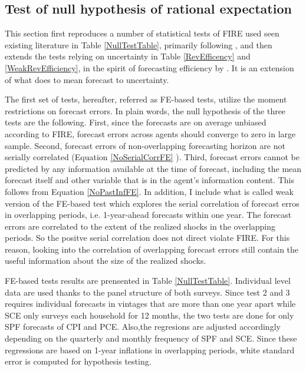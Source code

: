 \documentclass[]{article}
\begin{document}
\subsection{Test of null hypothesis of rational expectation}\label{NullTest}

This section first reproduces a number of statistical tests of FIRE used seen existing literature in Table \ref{NullTestTable}, primarily following \citet{mankiw2003disagreement},  and then extends the tests relying on uncertainty in Table \ref{RevEfficency} and \ref{WeakRevEfficiency}, in the spirit of forecasting efficiency by \citet{nordhaus1987forecasting}. It is an extension of what \citet{fuhrer2018intrinsic} does to mean forecast to uncertainty.  
 
The first set of tests, hereafter, referred as FE-based tests, utilize the moment restrictions on forecast errors. In plain words, the null hypothesis of the three tests are the following. First, since the forecasts are on average unbiased according to FIRE, forecast errors across agents should converge to zero in large sample. Second, forecast errors of non-overlapping forecasting horizon are not serially correlated (Equation \ref{NoSerialCorrFE} ).  Third, forecast errors cannot be predicted by any information available at the time of forecast, including the mean forecast itself and other variable that is in the agent's information content. This follows from Equation \ref{NoPastInfFE}. In addition, I include what is called weak version of the FE-based test which explores the serial correlation of forecast erros in overlapping periods,  i.e. 1-year-ahead forecasts within one year. The forecast errors are correlated to the extent of the realized shocks in the overlapping periods. So the positve serial correlation does not direct violate FIRE. For this reason, looking into the correlation of overlapping forecast errors still contain the useful information about the size of the realized shocks. 

FE-based tests results are prensented in Table \ref{NullTestTable}. Individual level data are used thanks to the panel structure of both surveys. Since test 2 and 3 requires individual forecasts in vintages that are more than one year apart while SCE only surveys each household for 12 months, the two tests are done for only SPF forecasts of CPI and PCE. Also,the regresions are adjusted accordingly depending on the quarterly and monthly frequency of SPF and SCE. Since these regressions are based on 1-year inflations in overlapping periods, white standard error is computed for hypothesis testing. 
\end{document}
